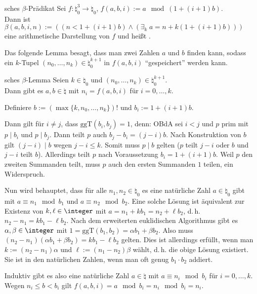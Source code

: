 \linie
\pagebreak

\begin{Def}{sches $\beta$-Prädikat}
    Sei $f\colon \natural_0^3 \rightarrow \natural_0$,
    $f(a, b, i) := a \mod (1 + (i + 1)b)$.\\
    Dann ist
    $\beta(a, b, i, n) := ((n < 1 + (i + 1)b) \land (\exists_k\; a = n + k(1 + (i + 1)b)))$
    eine arithmetische Darstellung von $f$ und heißt .
\end{Def}

\begin{Bem}
    Das folgende Lemma besagt, dass man zwei Zahlen $a$ und $b$ finden kann, sodass
    ein $k$-Tupel $(n_0, \dotsc, n_k) \in \natural_0^{k+1}$ in $f(a, b, i)$
    "`gespeichert"' werden kann.
\end{Bem}

\begin{Lemma}{sches $\beta$-Lemma}
    Seien $k \in \natural_0$ und $(n_0, \dotsc, n_k) \in \natural_0^{k+1}$.\\
    Dann gibt es $a, b \in \natural$ mit $n_i = f(a, b, i)$ für $i = 0, \dotsc, k$.
\end{Lemma}

\begin{Beweis}
    Definiere $b := (\max\{k, n_0, \dotsc, n_k\})!$ und $b_i := 1 + (i + 1)b$.

    Dann gilt für $i \not= j$, dass $\text{ggT}(b_i, b_j) = 1$, denn:
    OBdA sei $i < j$ und $p$ prim mit $p \;|\; b_i$ und $p \;|\; b_j$.
    Dann teilt $p$ auch $b_j - b_i = (j - i)b$.
    Nach Konstruktion von $b$ gilt $(j - i) \;|\; b$ wegen $j - i \le k$.
    Somit muss $p \;|\; b$ gelten ($p$ teilt $j - i$ oder $b$ und $j - i$ teilt $b$).
    Allerdings teilt $p$ nach Voraussetzung $b_i = 1 + (i + 1)b$.
    Weil $p$ den zweiten Summanden teilt, muss $p$ auch den ersten Summanden $1$ teilen,
    ein Widerspruch.

    Nun wird behauptet, dass für alle $n_1, n_2 \in \natural_0$ es eine natürliche Zahl
    $a \in \natural_0$ gibt mit $a \equiv n_1 \mod b_1$ und $a \equiv n_2 \mod b_2$.
    Eine solche Lösung ist äquivalent zur Existenz von
    $k, \ell \in \integer$ mit $a = n_1 + kb_1 = n_2 + \ell b_2$,
    d.\,h. $n_2 - n_1 = kb_1 - \ell b_2$.
    Nach dem erweiterten euklidischen Algorithmus gibt es $\alpha, \beta \in \integer$ mit
    $1 = \text{ggT}(b_1, b_2) = \alpha b_1 + \beta b_2$.
    Also muss $(n_2 - n_1)(\alpha b_1 + \beta b_2) = kb_1 - \ell b_2$ gelten.
    Dies ist allerdings erfüllt, wenn man $k := (n_2 - n_1)\alpha$ und $\ell := (n_1 - n_2)\beta$
    wählt, d.\,h. die obige Lösung existiert.
    Sie ist in den natürlichen Zahlen, wenn man oft genug $b_1 \cdot b_2$ addiert.

    Induktiv gibt es also eine natürliche Zahl $a \in \natural$ mit
    $a \equiv n_i \mod b_i$ für $i = 0, \dotsc, k$.
    Wegen $n_i \le b < b_i$ gilt $f(a, b, i) = a \mod b_i = n_i \mod b_i = n_i$.
\end{Beweis}

